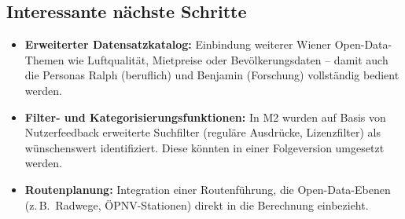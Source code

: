 \subsection{Interessante nächste Schritte}

\begin{itemize}
  \item \textbf{Erweiterter Datensatzkatalog:}
        Einbindung weiterer Wiener Open-Data-Themen wie Luftqualität,
        Mietpreise oder Bevölkerungsdaten – damit auch die Personas Ralph
        (beruflich) und Benjamin (Forschung) vollständig bedient werden.
  \item \textbf{Filter- und Kategorisierungsfunktionen:}
        In M2 wurden auf Basis von Nutzerfeedback erweiterte Suchfilter
        (reguläre Ausdrücke, Lizenzfilter) als wünschenswert identifiziert.
        Diese könnten in einer Folgeversion umgesetzt werden.
  \item \textbf{Routenplanung:}
        Integration einer Routenführung, die Open-Data-Ebenen
        (z.\,B.\ Radwege, ÖPNV-Stationen) direkt in die Berechnung einbezieht.
\end{itemize}
